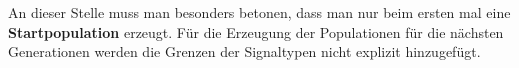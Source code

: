 An dieser Stelle muss man besonders betonen, dass man nur beim ersten mal eine \textbf{Startpopulation} erzeugt. 
F{\"u}r die Erzeugung der Populationen f{\"u}r die n{\"a}chsten Generationen werden die Grenzen der Signaltypen nicht explizit hinzugef{\"u}gt. 








